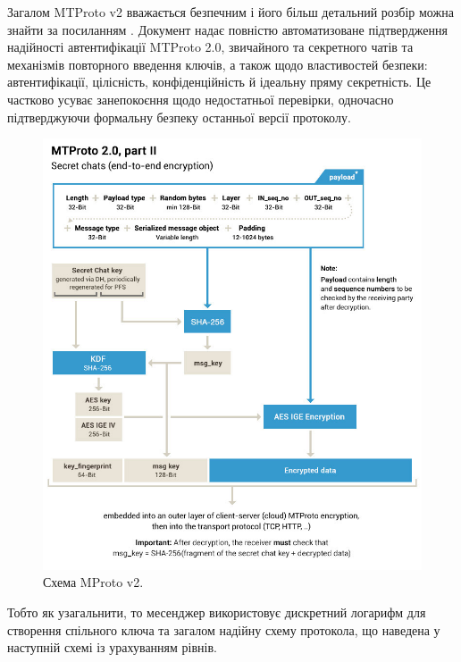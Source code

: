 Загалом MTProto v2 вважається безпечним і його більш детальний розбір можна знайти за посиланням \cite{miculan2021mtproto_v2}. Документ надає повністю автоматизоване підтвердження надійності автентифікації MTProto 2.0, звичайного та секретного чатів та механізмів повторного введення ключів, а також щодо властивостей безпеки: автентифікації, цілісність, конфіденційність й ідеальну пряму секретність. Це частково усуває занепокоєння щодо недостатньої перевірки, одночасно підтверджуючи формальну безпеку останньої версії протоколу.

\begin{figure}[ht]
        \centering
        \includegraphics[scale=0.37]{../IMAGES/mproto2.jpeg}
        \caption{Схема MProto v2.}
        \label{mproto2}
\end{figure}

Тобто як узагальнити, то месенджер використовує дискретний логарифм для створення спільного ключа та загалом надійну схему протокола, що наведена у наступній схемі із урахуванням рівнів.

